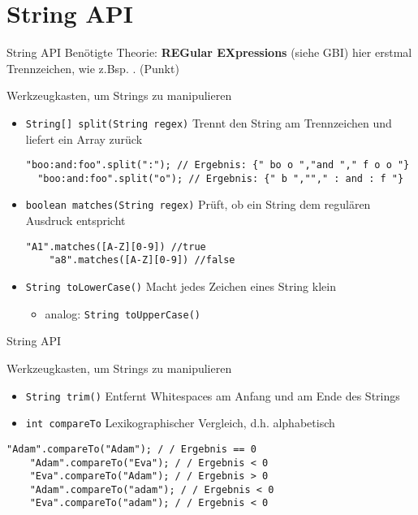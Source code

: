 \documentclass[18pt]{beamer}
\begin{document}
\section{String API}
\begin{frame}[fragile]{String API}
Benötigte Theorie: \textbf{REGular EXpressions} (siehe GBI) hier erstmal Trennzeichen, wie z.Bsp.     . (Punkt) \pause
\begin{block}{Werkzeugkasten, um Strings zu manipulieren}\pause
\begin{itemize}
	\item \lstinline{String[] split(String regex)} Trennt den String am Trennzeichen und liefert ein Array zurück\pause
	\begin{lstlisting}[basicstyle=\scriptsize]
	"boo:and:foo".split(":"); // Ergebnis: {" bo o ","and "," f o o "} 
  "boo:and:foo".split("o"); // Ergebnis: {" b ",""," : and : f "} 
	\end{lstlisting}  \pause
	\item \lstinline{boolean matches(String regex)} Prüft, ob ein String dem regulären Ausdruck entspricht \pause
	\begin{lstlisting}[basicstyle=\scriptsize]
	"A1".matches([A-Z][0-9]) //true 
	"a8".matches([A-Z][0-9]) //false 
	\end{lstlisting} \pause
	\item \lstinline{String toLowerCase()} Macht jedes Zeichen eines String klein\pause
	\begin{itemize}
		\item analog: \lstinline{String toUpperCase()} \pause
	\end{itemize}
\end{itemize}
\end{block}
\end{frame}


\begin{frame}[fragile]{String API}
\begin{block}{Werkzeugkasten, um Strings zu manipulieren} \pause
\begin{itemize}
\item \lstinline{String trim()} Entfernt Whitespaces am Anfang und am Ende des Strings \pause
\item \lstinline{int compareTo} Lexikographischer Vergleich, d.h. alphabetisch \pause
\end{itemize}	 \pause
\begin{lstlisting}[basicstyle=\tiny]
	"Adam".compareTo("Adam"); / / Ergebnis == 0 
	"Adam".compareTo("Eva"); / / Ergebnis < 0 
	"Eva".compareTo("Adam"); / / Ergebnis > 0 
	"Adam".compareTo("adam"); / / Ergebnis < 0 
	"Eva".compareTo("adam"); / / Ergebnis < 0 
\end{lstlisting} 
\end{block}
\end{frame}
\end{document}
